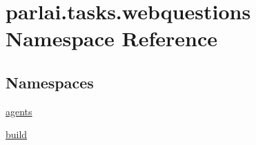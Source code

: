 \hypertarget{namespaceparlai_1_1tasks_1_1webquestions}{}\section{parlai.\+tasks.\+webquestions Namespace Reference}
\label{namespaceparlai_1_1tasks_1_1webquestions}
\subsection*{Namespaces}
\begin{DoxyCompactItemize}
\item 
 \hyperlink{namespaceparlai_1_1tasks_1_1webquestions_1_1agents}{agents}
\item 
 \hyperlink{namespaceparlai_1_1tasks_1_1webquestions_1_1build}{build}
\end{DoxyCompactItemize}
